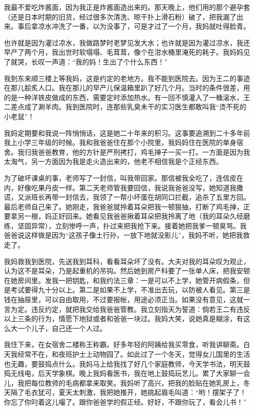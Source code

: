  我最不爱吃炸酱面，因为我正是炸酱面造出来的。那天晚上，他们用的那个避孕套（还是日本时期的旧货，经过很多次清洗、晾干扑上滑石粉）破了，把我漏了出来。事后拿凉水冲洗了一番，以为没事了，可是才过了一个月，我妈就吐得脸青。 
 
 也许就是因为灌过凉水，我做路梦时老梦见发大水；也许就是因为灌过凉水，我还早产了两个月，我出世时软塌塌、毛茸茸，像个在泔水桶里淹死的耗子。我妈妈见了就哭，长叹一声道：“我的妈！生出了个什么东西！” 
 
 我到东来顺三楼上等我妈，这是约定的老地方。我不能到医院去。因为王二的事迹在那儿脍炙人口。我在那儿的早产儿保温箱里趴了好几个月。当时的条件很差，用的是一种洋铁皮做成的东西，需要定时添加热水。有一回不慎灌入了一桶滚水，王二差点成了涮羊肉。我到医院时，连那些乳臭未干的实习医生都敢叫我“烫不死的小老鼠”！ 
 
 我妈定期要和我说一阵悄悄话，这是她二十年来的积习。这事要追溯到二十多年前我上小学三年级的时候。我和我爸爸住在那个小院里，我妈妈住在医院的单身宿舍。我归我爸爸教育，他的方针是严刑拷打，鸡毛掸子一买一打。一方面是因为我太淘气，另一方面因为我是走火造出来的，他老不相信我是个正经东西。 
 
 为了破坏课桌的事，老师写了一封信，叫我带回家。那信被我全吃了，连信皮在内，好像吃果丹皮一样。第二天老师管我要回信，我说我爸爸没写，她知道我撒谎，又派班长再带一封信去，我领了一帮小坏蛋在胡同口拦截，追杀了五里方回。最后老师自己来了。她刚走，我爸爸就拎着耳朵把我一顿狠抽，打断了鸡毛掸，正要拿另一根，妈正好回来。她看见我爸爸揪着耳朵把我拎离了地（我的耳朵久经磨练，坚固异常），立刻惨呼一声，扑过来把我抢下来。接着她把我爹一顿臭骂。我爸爸说这样做是因为“这孩子像土行孙，一放下地就没影儿”，我妈不听，她把我救走了。 
 
 我妈救我到医院，先送我到耳科，看看耳朵坏了没有。大夫对我的耳朵叹为观止，认为这不是耳朵，乃是起重机的吊钩。然后她到房产科要了一张单人床，把我安顿在她房间里。发我一把钥匙，和我约法三章：一是可以不上学，她管开病假条，但是考试要得九十分以上。第二是如果不上学，不准出去玩，以防被人看见。第三是钱在抽屉里，可以自由取用，不过要报帐，用途必须正当。如果没有意见，这就一言为定。违反约定，就把我交给我爸爸管教。我立刻指天为誓道：倘若王二有违反以上三条的行为，情愿下地狱或者和爸爸一块过。我妈大笑，说她真是糊涂，有这么大一个儿子，自己还一个人过。 
 
 我住下来，在女宿舍二楼称王称霸。好多年轻的阿姨给我买零食，听我讲聊斋。白天我经常不在，和夜班护士上动物园了。如此过了一个冬天，觉得女儿国里的生活也无趣，要鼓捣点什么。我妈马上给我找了好几个家庭教师，今天学书法，明天鼓捣无线电，后天学象棋。晚上我妈看医书，我在地上鼓捣玩艺儿。累了大家聊一会儿，我把每位教师的毛病都拿来取笑。我妈听了高兴，把我的脸贴在她乳房上，冬天隔了毛衣犹可，夏天太刺激，我把她推开，她挑起眉毛叫道：“哟！摆架子了！你忘了你叼着这儿嘬了。跟你爸爸学的假正经。好好，不跟你玩了，看会儿书！” 
 

